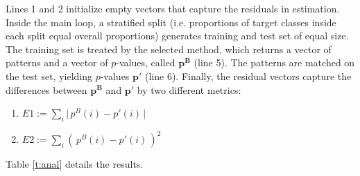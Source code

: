 \documentclass{article}
\begin{document}
Lines 1 and 2 initialize empty vectors that capture the residuals in estimation. Inside the main loop, a stratified split (i.e. proportions of target classes inside each split equal overall proportions) generates training and test set of equal size. The training set is treated by the selected method, which returns a vector of patterns and a vector of $p$-values, called $\mathbf{p^B}$ (line 5). The patterns are matched on the test set, yielding $p$-values $\mathbf{p'}$ (line 6). Finally, the residual vectors capture the differences between $\mathbf{p^B}$ and  $\mathbf{p'}$ by two different metrics:
\begin{enumerate}
  \item $E1 := \sum_i \Big|\,p^B(i) -p'(i) \,\Big|$
  \item $E2 := \sum_i \left(\, p^B(i) -p'(i) \,\right)^2$
\end{enumerate}

Table \ref{t:anal} details the results.





\end{document}
